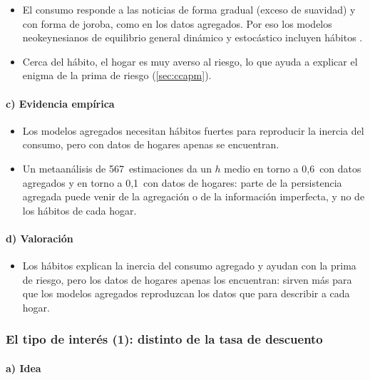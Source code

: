 \documentclass[11pt]{article}
\begin{document}
\begin{itemize}
\item El consumo responde a las noticias de forma gradual (exceso de suavidad) y con forma de joroba, como en los datos agregados. Por eso los modelos neokeynesianos de equilibrio general dinámico y estocástico incluyen hábitos\nocite{ChristianoEichenbaumEvans2005} .
\item Cerca del hábito, el hogar es muy averso al riesgo, lo que ayuda a explicar el enigma de la prima de riesgo (\ref{sec:ccapm})\nocite{CampbellCochrane1999Force}.
\end{itemize}

\paragraph{c) Evidencia empírica}

\begin{itemize}
\item Los modelos agregados necesitan hábitos fuertes para reproducir la inercia del consumo\nocite{Fuhrer2000Habit}, pero con datos de hogares apenas se encuentran\nocite{Dynan2000Habit}.
\item Un metaanálisis de 567~estimaciones da un $h$ medio en torno a 0,6~con datos agregados y en torno a 0,1~con datos de hogares\nocite{HavranekEtAl2017Habit}: parte de la persistencia agregada puede venir de la agregación o de la información imperfecta, y no de los hábitos de cada hogar.
\end{itemize}

\paragraph{d) Valoración}

\begin{itemize}
\item Los hábitos explican la inercia del consumo agregado y ayudan con la prima de riesgo, pero los datos de hogares apenas los encuentran: sirven más para que los modelos agregados reproduzcan los datos que para describir a cada hogar.
\end{itemize}

\subsubsection{El tipo de interés (1): distinto de la tasa de descuento}\label{sec:r-rho}

\paragraph{a) Idea}
\end{document}
